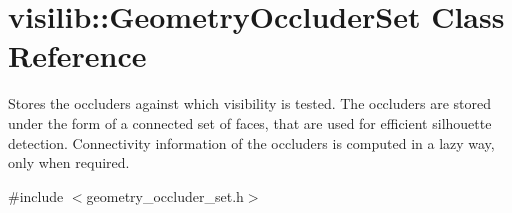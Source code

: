 \hypertarget{classvisilib_1_1_geometry_occluder_set}{}\section{visilib\+::Geometry\+Occluder\+Set Class Reference}
\label{classvisilib_1_1_geometry_occluder_set}


Stores the occluders against which visibility is tested. The occluders are stored under the form of a connected set of faces, that are used for efficient silhouette detection. Connectivity information of the occluders is computed in a lazy way, only when required.  




{\ttfamily \#include $<$geometry\+\_\+occluder\+\_\+set.\+h$>$}

